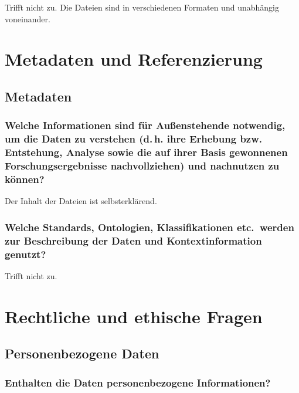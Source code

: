 \documentclass[%
  11pt,
  DIV=16,
  a4paper,
  BCOR=15mm,
  twoside=on,
  bibliography=totoc,
  headings=normal,
  numbers=noendperiod,
]{scrartcl}
\begin{document}
Trifft nicht zu. Die Dateien sind in verschiedenen Formaten und unabhängig voneinander.

\section{Metadaten und Referenzierung}

\subsection{Metadaten}

\subsubsection{Welche Informationen sind für Außenstehende notwendig, um die Daten zu verstehen (\texorpdfstring{d.\,h.}{d.h.} ihre Erhebung bzw. Entstehung, Analyse sowie die auf ihrer Basis gewonnenen Forschungsergebnisse nachvollziehen) und nachnutzen zu können?}

Der Inhalt der Dateien ist selbsterklärend.

\subsubsection{Welche Standards, Ontologien, Klassifikationen etc.\ werden zur Beschreibung der Daten und Kontextinformation genutzt?}

Trifft nicht zu.

\section{Rechtliche und ethische Fragen}

\subsection{Personenbezogene Daten}

\subsubsection{Enthalten die Daten personenbezogene Informationen?}
\end{document}
